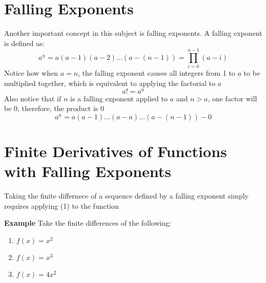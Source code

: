 \section{Falling Exponents}
Another important concept in this subject is falling exponents. A falling exponent is defined as:
\begin{equation}\label{eq:3}
    a^{\underline{n}} = a(a-1)(a-2)...(a-(n-1)) = \prod_{i=0}^{n-1} (a-i)
\end{equation}
Notice how when \(a=n\), the falling exponent causes all integers from 1 to \(a\) to be multiplied together, which is equivalent to applying the factorial to \(a\)
\[a! = a^{\underline{a}}\]
Also notice that if \(n\) is a falling exponent applied to \(a\) and \(n>a\), one factor will be 0, therefore, the product is 0
\[a^{\underline{n}} = a(a-1)...(a-a)...(a-(n-1)) - 0\]

\section{Finite Derivatives of Functions with Falling Exponents}
Taking the finite differnece of a sequence defined by a falling exponent simply requires applying (1) to the function

\textbf{Example}
Take the finite differences of the following:
\begin{enumerate}
    \item \(f(x) = x^{\underline{2}}\)
    \item \(f(x) = x^{\underline{3}}\)
    \item \(f(x) = 4x^{\underline{2}}\)
\end{enumerate}

